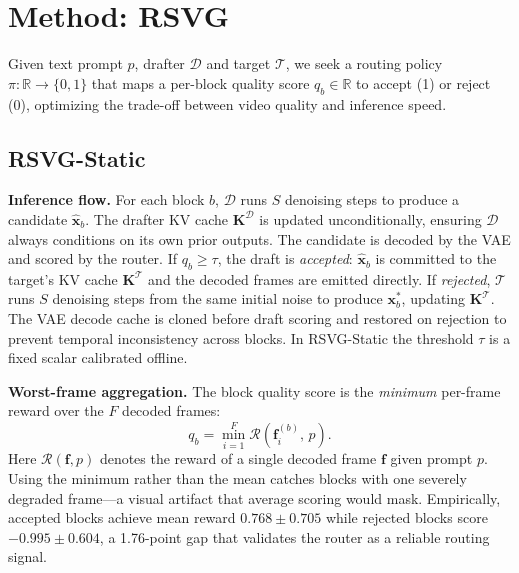 \documentclass{article}
\newcommand{\Drafter}{\mathcal{D}}
\newcommand{\Target}{\mathcal{T}}
\newcommand{\ImageReward}{\mathcal{R}}
\newcommand{\score}{q}
\newcommand{\threshold}{\tau}
\begin{document}
\section{Method: RSVG}
\label{sec:method}

Given text prompt $p$, drafter $\Drafter$ and target $\Target$,
we seek a routing policy $\pi: \mathbb{R} \to \{0,1\}$ that maps a
per-block quality score $\score_b \in \mathbb{R}$ to accept (1) or
reject (0), optimizing the trade-off between video quality and inference
speed.

\subsection{RSVG-Static}

\textbf{Inference flow.}
For each block $b$, $\Drafter$ runs $S$ denoising steps to produce a
candidate $\hat{\mathbf{x}}_b$.
The drafter KV cache $\mathbf{K}^{\Drafter}$ is updated unconditionally,
ensuring $\Drafter$ always conditions on its own prior outputs.
The candidate is decoded by the VAE and scored by the router.
If $\score_b \geq \threshold$, the draft is \emph{accepted}:
$\hat{\mathbf{x}}_b$ is committed to the target's KV cache
$\mathbf{K}^{\Target}$ and the decoded frames are emitted directly.
If \emph{rejected}, $\Target$ runs $S$ denoising steps from the same
initial noise to produce $\mathbf{x}^*_b$, updating $\mathbf{K}^{\Target}$.
The VAE decode cache is cloned before draft scoring and restored on
rejection to prevent temporal inconsistency across blocks.
In RSVG-Static the threshold $\threshold$ is a fixed scalar calibrated
offline.

\textbf{Worst-frame aggregation.}
The block quality score is the \emph{minimum} per-frame reward over the
$F$ decoded frames:
\begin{equation}
  \score_b = \min_{i=1}^{F}
  \ImageReward\!\left(\mathbf{f}^{(b)}_i,\, p\right).
  \label{eq:minscore}
\end{equation}
Here $\ImageReward(\mathbf{f}, p)$ denotes the reward of a single decoded
frame $\mathbf{f}$ given prompt $p$.
Using the minimum rather than the mean catches blocks with one severely
degraded frame---a visual artifact that average scoring would mask.
Empirically, accepted blocks achieve mean reward $0.768\pm0.705$
while rejected blocks score $-0.995\pm0.604$, a 1.76-point gap that
validates the router as a reliable routing signal.
\end{document}
